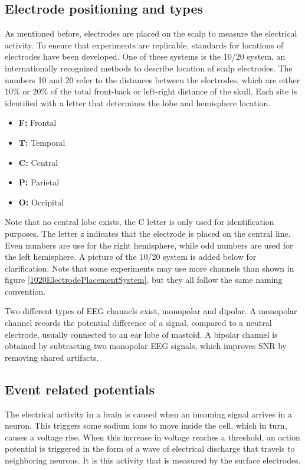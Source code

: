 \clearpage

\subsection{Electrode positioning and types}
As mentioned before, electrodes are placed on the scalp to measure the electrical activity. To ensure that experiments are replicable, standards for locations of electrodes have been developed. One of these systems is the 10/20 system, an internationally recognized methods to describe location of scalp electrodes\cite{TenTwentyManual}. The numbers 10 and 20 refer to the distances between the electrodes, which are either 10\% or 20\% of the total front-back or left-right distance of the skull. Each site is identified with a letter that determines the lobe and hemisphere location.
\begin{itemize}
\item \textbf{F:} Frontal
\item \textbf{T:} Temporal
\item \textbf{C:} Central
\item \textbf{P:} Parietal
\item \textbf{O:} Occipital
\end{itemize}
Note that no central lobe exists, the C letter is only used for identification purposes. The letter z indicates that the electrode is placed on the central line. Even numbers are use for the right hemisphere, while odd numbers are used for the left hemisphere. A picture of the 10/20 system is added below for clarification. Note that some experiments may use more channels than shown in figure \ref{1020ElectrodePlacementSystem}, but they all follow the same naming convention.


Two different types of EEG channels exist, monopolar and dipolar. A monopolar channel records the potential difference of a signal, compared to a neutral electrode, usually connected to an ear lobe of mastoid. A bipolar channel is obtained by subtracting two monopolar EEG signals, which improves SNR by removing shared artifacts\cite{MonoBiPolar}. 

\subsection{Event related potentials}

The electrical activity in a brain is caused when an incoming signal arrives in a neuron. This triggers some sodium ions to move inside the cell, which in turn, causes a voltage rise\cite{ExtendedPaper}. When this increase in voltage reaches a threshold, an action potential is triggered in the form of a wave of electrical discharge that travels to neighboring neurons. It is this activity that is measured by the surface electrodes.


